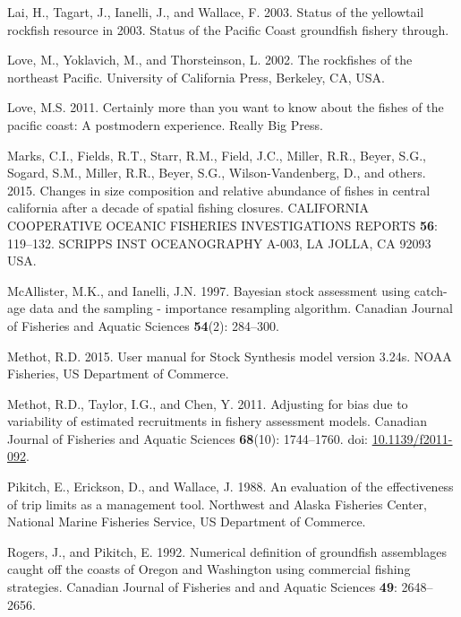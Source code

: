 \documentclass[12pt,]{article}
\begin{document}
\hypertarget{ref-Lai2003}{}
Lai, H., Tagart, J., Ianelli, J., and Wallace, F. 2003. Status of the
yellowtail rockfish resource in 2003. Status of the Pacific Coast
groundfish fishery through.

\hypertarget{ref-Love2002}{}
Love, M., Yoklavich, M., and Thorsteinson, L. 2002. The rockfishes of
the northeast Pacific. University of California Press, Berkeley, CA,
USA.

\hypertarget{ref-Love2011}{}
Love, M.S. 2011. Certainly more than you want to know about the fishes
of the pacific coast: A postmodern experience. Really Big Press.

\hypertarget{ref-Marks2015}{}
Marks, C.I., Fields, R.T., Starr, R.M., Field, J.C., Miller, R.R.,
Beyer, S.G., Sogard, S.M., Miller, R.R., Beyer, S.G., Wilson-Vandenberg,
D., and others. 2015. Changes in size composition and relative abundance
of fishes in central california after a decade of spatial fishing
closures. CALIFORNIA COOPERATIVE OCEANIC FISHERIES INVESTIGATIONS
REPORTS \textbf{56}: 119--132. SCRIPPS INST OCEANOGRAPHY A-003, LA
JOLLA, CA 92093 USA.

\hypertarget{ref-McAllister1997}{}
McAllister, M.K., and Ianelli, J.N. 1997. Bayesian stock assessment
using catch-age data and the sampling - importance resampling algorithm.
Canadian Journal of Fisheries and Aquatic Sciences \textbf{54}(2):
284--300.

\hypertarget{ref-Methot2015}{}
Methot, R.D. 2015. User manual for Stock Synthesis model version 3.24s.
NOAA Fisheries, US Department of Commerce.

\hypertarget{ref-Methot2011}{}
Methot, R.D., Taylor, I.G., and Chen, Y. 2011. Adjusting for bias due to
variability of estimated recruitments in fishery assessment models.
Canadian Journal of Fisheries and Aquatic Sciences \textbf{68}(10):
1744--1760. doi:
\href{https://doi.org/10.1139/f2011-092}{10.1139/f2011-092}.

\hypertarget{ref-Pikitch1988}{}
Pikitch, E., Erickson, D., and Wallace, J. 1988. An evaluation of the
effectiveness of trip limits as a management tool. Northwest and Alaska
Fisheries Center, National Marine Fisheries Service, US Department of
Commerce.

\hypertarget{ref-Rogers1992}{}
Rogers, J., and Pikitch, E. 1992. Numerical definition of groundfish
assemblages caught off the coasts of Oregon and Washington using
commercial fishing strategies. Canadian Journal of Fisheries and and
Aquatic Sciences \textbf{49}: 2648--2656.
\end{document}
